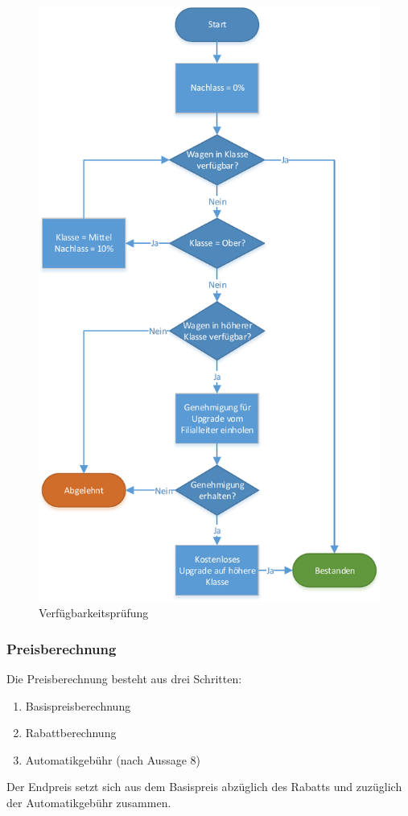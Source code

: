 \begin{figure}[H]
\centering
\includegraphics[width=0.55\linewidth]{Bilder/Verfuegbarkeit_pruefen}
\caption{Verfügbarkeitsprüfung}
\label{fig:Verfuegbarkeit_pruefen}
\end{figure}

\subsubsection{Preisberechnung}

Die Preisberechnung besteht aus drei Schritten:
\begin{enumerate}
	\item Basispreisberechnung
	\item Rabattberechnung
	\item Automatikgebühr (nach Aussage 8)
\end{enumerate}

Der Endpreis setzt sich aus dem Basispreis abzüglich des Rabatts und zuzüglich 
der Automatikgebühr zusammen.

